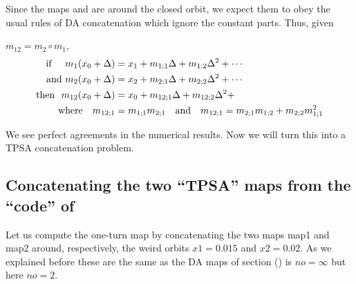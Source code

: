 \documentclass{hitec}     %
\begin{document}
{{{{{Since the maps  and  are around the closed orbit, we expect them to obey the usual rules of DA concatenation which ignore the constant parts. Thus, given {$m_{12}=m_2 \circ m_1$, 
%
\begin{subequations}\begin{align} {\rm i}{\rm f}~~~~{m}_{1}({x}_{0}+\Delta )&={x}_{1}+{m}_{1;1}\Delta +{m}_{1;2}{\Delta }^{2}+\cdots\label{eq:map1}\\ {\rm a}{\rm n}{\rm d} ~{m}_{2}({x}_{0}+\Delta )&={x}_{2}+{m}_{2;1}\Delta +{m}_{2;2}{\Delta }^{2}+\cdots \\ {\rm t}{\rm h}{\rm e}{\rm n}~~{m}_{12}({x}_{0}+\Delta )&={x}_{0}+{m}_{12;1}\Delta +{m}_{12;2}{\Delta }^{2}+\ \  \\~~~{\rm w}{\rm h}{\rm e}{\rm r}{\rm e}~~~{m}_{12;1}&=
{m}_{1;1}{m}_{2;1}~~~{\rm a}{\rm n}{\rm d} ~~~{m}_{12;1}=
{m}_{2;1}{m}_{1;2}+{m}_{2;2}{m}_{1;1}^{2} \end{align}\end{subequations}

We see perfect agreements in the numerical results. Now we will turn this into a TPSA concatenation problem.


\renewcommand{\codefont}{\small}

\subsection{Concatenating the two ``TPSA'' maps from the ``code'' of }\label{s:exampletpsa}
 
 Let us compute  the one-turn map by concatenating the two maps   map1 and map2 around, respectively,  the weird orbits $x1= 0.015$ and $x2=0.02$.  As we explained before these are the same as the DA maps of section () is $no=\infty$ but here $no=2$.

}}}}}}
\end{document}
